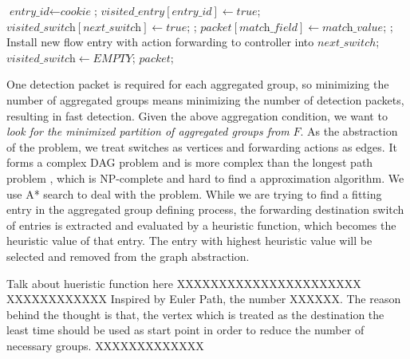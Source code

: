 \begin {tcolorbox}[blanker,float=tbp,
grow to left by=1cm, grow to right by=1cm]
\begin{algorithm}[H]
  \begin{algorithmic}[1]
        \State $\textit{entry\_id} \gets \textit{cookie}$;
          \State $\textit{visited\_entry}[\textit{entry\_id}] \gets true$;
          \State $\textit{visited\_switch}[\textit{next\_switch}] \gets true$;
            \State \Return {};
            \State $\textit{packet}[\textit{match\_field}] \gets \textit{match\_value}$;
            \State \Return {};
          \EndIf
        \EndIf
      \EndFor
      \State Install new flow entry with action forwarding to controller into $next\_switch$;
      \State $\textit{visited\_switch} \gets EMPTY$;
      \State \Return $packet$;
    \EndFunction
  \end{algorithmic}
\end{algorithm}
\end{tcolorbox}


One detection packet is required for each aggregated group, so minimizing the number of aggregated groups means minimizing the number of detection packets, resulting in fast detection. Given the above aggregation condition, we want to \textit{look for the minimized partition of aggregated groups from} $F$. As the abstraction of the problem, we treat switches as vertices and forwarding actions as edges. It forms a complex DAG problem and is more complex than the longest path problem \cite{DMR97,RU04}, which is NP-complete and hard to find a approximation algorithm. We use A* search to deal with the problem. While we are trying to find a fitting entry in the aggregated group defining process, the forwarding destination switch of entries is extracted and evaluated by a heuristic function, which becomes the heuristic value of that entry. The entry with highest heuristic value will be selected and removed from the graph abstraction.

Talk about hueristic function here XXXXXXXXXXXXXXXXXXXXXX
XXXXXXXXXXXX Inspired by Euler Path, the number XXXXXX. The reason behind the thought is that, the vertex which is treated as the destination the least time should be used as start point in order to reduce the number of necessary groups.
XXXXXXXXXXXXX

